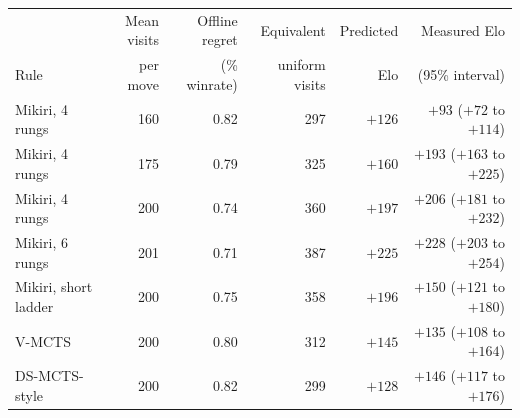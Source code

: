 \begin{tabular}{lrrrrr}
\toprule
 & Mean visits & Offline regret & Equivalent & Predicted & Measured Elo \\
Rule & per move & (\% winrate) & uniform visits & Elo & (95\% interval) \\
\midrule
Mikiri, 4 rungs & 160 & 0.82 & 297 & $+126$ & $+93$ ($+72$ to $+114$) \\
Mikiri, 4 rungs & 175 & 0.79 & 325 & $+160$ & $+193$ ($+163$ to $+225$) \\
Mikiri, 4 rungs & 200 & 0.74 & 360 & $+197$ & $+206$ ($+181$ to $+232$) \\
Mikiri, 6 rungs & 201 & 0.71 & 387 & $+225$ & $+228$ ($+203$ to $+254$) \\
Mikiri, short ladder & 200 & 0.75 & 358 & $+196$ & $+150$ ($+121$ to $+180$) \\
V-MCTS & 200 & 0.80 & 312 & $+145$ & $+135$ ($+108$ to $+164$) \\
DS-MCTS-style & 200 & 0.82 & 299 & $+128$ & $+146$ ($+117$ to $+176$) \\
\bottomrule
\end{tabular}
